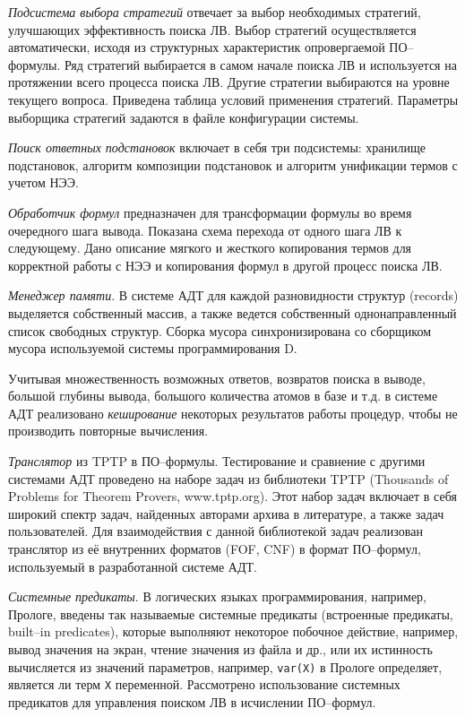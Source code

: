 \documentclass[a4paper]{report}
\begin{document}
\emph{Подсистема выбора стратегий} отвечает за выбор необходимых стратегий, улучшающих эффективность поиска ЛВ. Выбор стратегий осуществляется автоматически, исходя из структурных характеристик опровергаемой ПО--формулы. Ряд стратегий выбирается в самом начале поиска ЛВ и используется на протяжении всего процесса поиска ЛВ. Другие стратегии выбираются на уровне текущего вопроса. Приведена таблица условий применения стратегий. Параметры выборщика стратегий задаются в файле конфигурации системы.

\emph{Поиск ответных подстановок} включает в себя три подсистемы: хранилище подстановок, алгоритм композиции подстановок и алгоритм унификации термов с учетом НЭЭ.

\emph{Обработчик формул} предназначен для трансформации формулы во время очередного шага вывода. Показана схема перехода от одного шага ЛВ к следующему. Дано описание мягкого и жесткого копирования термов для корректной работы с НЭЭ и копирования формул в другой процесс поиска ЛВ.

\emph{Менеджер памяти}. В системе АДТ для каждой разновидности структур (records) выделяется собственный массив, а также ведется собственный однонаправленный список свободных структур. Сборка мусора синхронизирована со сборщиком мусора используемой системы программирования D.

Учитывая множественность возможных ответов, возвратов поиска в выводе, большой глубины вывода, большого количества атомов в базе и т.д. в системе АДТ реализовано \emph{кеширование} некоторых результатов работы процедур, чтобы не производить повторные вычисления.

\emph{Транслятор} из TPTP в ПО--формулы. Тестирование и сравнение с другими системами АДТ проведено на наборе задач из библиотеки TPTP (Thousands of Problems for Theorem Provers, www.tptp.org). Этот набор задач включает в себя широкий спектр задач, найденных авторами архива в литературе, а также задач пользователей. Для взаимодействия с данной библиотекой задач реализован транслятор из её внутренних форматов (FOF, CNF) в формат ПО--формул, используемый в разработанной системе АДТ.

\emph{Системные предикаты}. В логических языках программирования, например, Прологе, введены так называемые системные предикаты (встроенные предикаты, built--in predicates), которые выполняют некоторое побочное действие, например, вывод значения на экран, чтение значения из файла и др., или их истинность вычисляется из значений параметров, например, \texttt{var(X)} в Прологе определяет, является ли терм \texttt{X} переменной. Рассмотрено использование системных предикатов для управления поиском ЛВ в исчислении ПО--формул.
\end{document}
